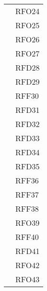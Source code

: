 \begin{longtable}{|>{\centering}m{10cm}|m{3cm}<{\centering}|}
& RFO24\\
& RFO25\\
& RFO26\\
& RFO27\\
& RFD28\\
& RFD29\\
& RFF30\\
& RFD31\\
& RFD32\\
& RFD33\\
& RFD34\\
& RFD35\\
& RFF36\\
& RFF37\\
& RFF38\\
& RFO39\\
& RFF40\\
& RFD41\\
& RFO42\\
& RFO43\\ \hline


\end{longtable}
